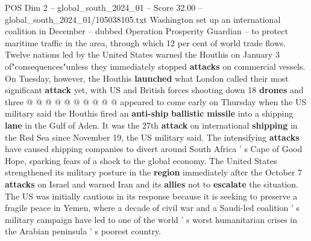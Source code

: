 \begin{textsample}{POS Dim 2 – global\_south\_2024\_01 – Score 32.00 – global\_south\_2024\_01/105038105.txt}
Washington set up an international coalition in December -- dubbed Operation Prosperity Guardian -- to protect maritime traffic in the area, through which 12 per cent of world trade flows.
Twelve nations led by the United States warned the Houthis on January 3 of"consequences"unless they immediately stopped \textbf{attacks} on commercial vessels.
On Tuesday, however, the Houthis \textbf{launched} what London called their most significant \textbf{attack} yet, with US and British forces shooting down 18 \textbf{drones} and three @ @ @ @ @ @ @ @ @ @ appeared to come early on Thursday when the US military said the Houthis fired an \textbf{anti-ship} \textbf{ballistic} \textbf{missile} into a shipping \textbf{lane} in the Gulf of Aden.
It was the 27th \textbf{attack} on international \textbf{shipping} in the Red Sea since November 19, the US military said.
The intensifying \textbf{attacks} have caused shipping companies to divert around South Africa ' s Cape of Good Hope, sparking fears of a shock to the global economy.
The United States strengthened its military posture in the \textbf{region} immediately after the October 7 \textbf{attacks} on Israel and warned Iran and its \textbf{allies} not to \textbf{escalate} the situation.
The US was initially cautious in its response because it is seeking to preserve a fragile peace in Yemen, where a decade of civil war and a Saudi-led coalition ' s military campaign have led to one of the world ' s worst humanitarian crises in the Arabian peninsula ' s poorest country.

\end{textsample}

